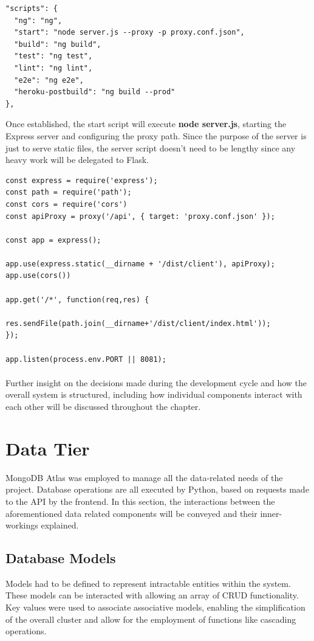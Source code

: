 \begin{lstlisting}[caption=Proxy Reference]
"scripts": {
  "ng": "ng",
  "start": "node server.js --proxy -p proxy.conf.json",
  "build": "ng build",
  "test": "ng test",
  "lint": "ng lint",
  "e2e": "ng e2e",
  "heroku-postbuild": "ng build --prod"
},
\end{lstlisting}

Once established, the start script will execute \textbf{node server.js}, starting the Express server and configuring the proxy path. Since the purpose of the server is just to serve static files, the server script doesn't need to be lengthy since any heavy work will be delegated to Flask. \newline

\begin{lstlisting}[caption=Express Server Runner]
const express = require('express');
const path = require('path');
const cors = require('cors')
const apiProxy = proxy('/api', { target: 'proxy.conf.json' });

const app = express();

app.use(express.static(__dirname + '/dist/client'), apiProxy);
app.use(cors())

app.get('/*', function(req,res) {

res.sendFile(path.join(__dirname+'/dist/client/index.html'));
});

app.listen(process.env.PORT || 8081);
\end{lstlisting}

\paragraph{}
Further insight on the decisions made during the development cycle and how the overall system is structured, including how individual components interact with each other will be discussed throughout the chapter.\newline

\section{Data Tier}
MongoDB Atlas was employed to manage all the data-related needs of the project. Database operations are all executed by Python, based on requests made to the API by the frontend. In this section, the interactions between the aforementioned data related components will be conveyed and their inner-workings explained.

\subsection{Database Models}
Models had to be defined to represent intractable entities within the system. These models can be interacted with allowing an array of CRUD functionality. Key values were used to associate associative models, enabling the simplification of the overall cluster and allow for the employment of functions like cascading operations.

